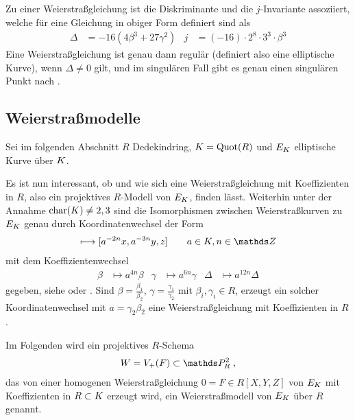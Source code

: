 Zu einer Weierstraßgleichung ist die Diskriminante und die
$j$-Invariante assoziiert, welche für eine Gleichung in obiger
Form definiert sind als 
\begin{align*}
  \Delta &= -16\left(4\beta^3 + 27\gamma^2\right)
  &j &= (-16)\cdot 2^8\cdot 3^3\cdot\beta^3
\end{align*}
Eine Weierstraßgleichung ist genau dann regulär (definiert also eine
elliptische Kurve), wenn $\Delta\neq 0$ gilt,
und im singulären Fall gibt es genau einen singulären Punkt
nach \cite[Proposition~III.1.4]{silverman}.


\subsection{Weierstraßmodelle}
Sei im folgenden Abschnitt $R$ Dedekindring,
$K=\operatorname{Quot}(R)$ und $E_{K}$ elliptische Kurve über $K$.

Es ist nun interessant, ob und wie sich eine Weierstraßgleichung mit
Koeffizienten in $R$, also ein projektives $R$-Modell von
$E_{K}$, finden lässt.
Weiterhin unter der Annahme ${\operatorname{char}(K)\neq2,3}$ sind die
Isomorphismen zwischen Weierstraßkurven zu $E_{K}$ genau durch
Koordinatenwechsel der Form
\begin{gather*}
  [x,y,z] \longmapsto [a^{-2n}x, a^{-3n}y, z] \qquad a\in\K, n\in\Z
\end{gather*}
mit dem Koeffizientenwechsel
\begin{align*}
  \beta&\mapsto a^{4n}\beta
  &\gamma&\mapsto a^{6n}\gamma
  &\Delta&\mapsto a^{12n}\Delta
\end{align*}
gegeben, siehe \cite[Lemma~1.5/2]{neron}
oder \cite[Chapter~VII.1]{silverman}.
Sind ${\beta=\frac{\beta_1}{\beta_2}}$,
${\gamma=\frac{\gamma_1}{\gamma_2}}$ mit ${\beta_i,\gamma_i\in R}$,
erzeugt ein solcher Koordinatenwechsel mit ${a=\gamma_2\beta_2}$ eine
Weierstraßgleichung mit Koeffizienten in $R$.
\begin{Definition}[Weierstraßmodell]
  Im Folgenden wird ein projektives $R$-Schema
  \begin{gather*}
    W=V_+(F)\subset\P_R^2\;,
  \end{gather*}
  das von einer homogenen
  Weierstraßgleichung $0=F\in R[X,Y,Z]$ von $E_{K}$ mit Koeffizienten
  in $R\subset K$ erzeugt wird, ein Weierstraßmodell von $E_{K}$ über
  $R$ genannt.
\end{Definition}

